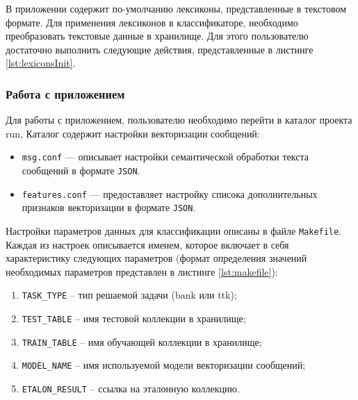             В приложении содержит по-умолчанию лексиконы, представленные в текстовом
            формате. Для применения лексиконов в классификаторе, необходимо преобразовать
            текстовые данные в хранилище. Для этого пользователю
            достаточно выполнить следующие действия, представленные в листинге
            \ref{lst:lexiconsInit}.
            \lstset{style=bash}
            

        \subsubsection{Работа с приложением}

            Для работы с приложением, пользователю необходимо перейти в каталог проекта {run},
            Каталог содержит настройки векторизации сообщений:
            \begin{itemize}
                \item {\tt msg.conf} --- описывает настройки семантической обработки текста
                    сообщений в формате {\tt JSON}.
                \item {\tt features.conf} --- предоставляет настройку списока
                    дополнительных признаков векторизации в формате {\tt JSON}.
            \end{itemize}

            Настройки параметров данных для классификации описаны в файле {\tt Makefile}.
            Каждая из настроек описывается именем, которое включает в себя
            характеристику следующих параметров (формат определения значений необходимых
            параметров представлен в листинге \ref{lst:makefile}):

            \begin{enumerate}
                \item {\tt TASK\_TYPE} -- тип решаемой задачи ({bank} или {ttk});
                \item {\tt TEST\_TABLE} -- имя тестовой коллекции в хранилище;
                \item {\tt TRAIN\_TABLE} -- имя обучающей коллекции в хранилище;
                \item {\tt MODEL\_NAME} -- имя используемой модели векторизации сообщений;
                \item {\tt ETALON\_RESULT} -- ссылка на эталонную коллекцию.
            \end{enumerate}

